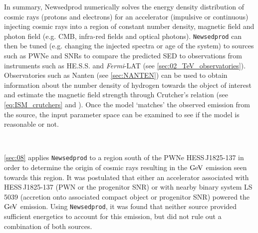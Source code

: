 In summary, {\tt} Newsedprod numerically solves the energy density distribution of cosmic rays (protons and electrons) for an accelerator (impulsive or continuous) injecting cosmic rays into a region of constant number density, magnetic field and photon field (e.g. CMB, infra-red fields and optical photons). {\tt Newsedprod} can then be tuned (e.g. changing the injected spectra or age of the system) to sources such as PWNe and SNRs to compare the predicted SED to observations from instruments such as HE.S.S. and \textit{Fermi}-LAT (see \autoref{sec:02_TeV_observatories}). Observatories such as Nanten (see \autoref{sec:NANTEN}) can be used to obtain information about the number density of hydrogen towards the object of interest and estimate the magnetic field strength through Crutcher's relation (see \autoref{eq:ISM_crutchers} and \cite{2010ApJ...725..466C}). Once the model `matches' the observed emission from the source, the input parameter space can be examined to see if the model is reasonable or not.
\par~\par
\autoref{sec:08} applies {\tt Newsedprod} to a region south of the PWNe \mbox{HESS\,J1825-137} in order to determine the origin of cosmic rays resulting in the $\si{\giga\electronvolt}$ emission seen towards this region. It was postulated that either an accelerator associated with \mbox{HESS\,J1825-137} (PWN or the progenitor SNR) or with nearby binary system \mbox{LS\,5039} (accretion onto associated compact object or progenitor SNR) powered the $\si{\giga\electronvolt}$ emission. Using {\tt Newsedprod}, it was found that neither source provided sufficient energetics to account for this emission, but did not rule out a combination of both sources.